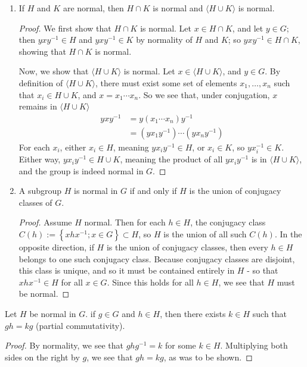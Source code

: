 \documentclass[12pt]{article}
\theoremstyle{definition}
\newenvironment{problem}[2][Problem]{\begin{trivlist}
\item[\hskip \labelsep {\bfseries #1}\hskip \labelsep {\bfseries #2.}]}{\end{trivlist}}
\begin{document}
\begin{problem}{6}
\begin{enumerate}[label=(\alph*)]
\item If $H$ and $K$ are normal, then $H \cap K$ is normal and $ \langle H \cup K \rangle$ is normal.
\begin{proof}
	We first show that $H\cap K$ is normal. Let $x \in H \cap K$, and let $y \in G$; then $yxy^{-1} \in H$ and $yxy^{-1} \in K$ by normality of $H$ and $K$; so $yxy^{-1} \in H \cap K$, showing that $H \cap K$ is normal.
	\par Now, we show that $\langle H \cup K\rangle$ is normal. Let $x \in \langle H \cup K\rangle$, and $y \in G$. By definition of $\langle H \cup K\rangle$, there must exist some set of elements $x_1, \dots , x_n$ such that $x_i \in H \cup K$, and $x = x_1 \cdots x_n$. So we see that, under conjugation, $x$ remains in $\langle H \cup K\rangle$
	\begin{align*}
		yxy^{-1} &= y(x_1\cdots x_n)y^{-1}\\
		&= (yx_1y^{-1})\cdots (yx_ny^{-1})
	\end{align*}
	For each $x_i$, either $x_i \in H$, meaning $yx_iy^{-1} \in H$, or $x_i \in K$, so $yx_i^{-1} \in K$. Either way, $yx_iy^{-1} \in H \cup K$, meaning the product of all $yx_iy^{-1}$ is in $\langle H \cup K\rangle$, and the group is indeed normal in $G$.
\end{proof}
    \item  A subgroup $H$ is normal in $G$ if and only if $H$ is the union of conjugacy classes of $G$.
    \begin{proof}
	    Assume $H$ normal. Then for each $h \in H$, the conjugacy class $C(h) := \left\{ xhx^{-1} ; x \in G \right\} \subset H$, so $H$ is the union of all such $C(h)$. In the opposite direction, if $H$ is the union of conjugacy classes, then every $h \in H$ belongs to one such conjugacy class. Because conjugacy classes are disjoint, this class is unique, and so it must be contained entirely in $H$ - so that $xhx^{-1} \in H$ for all $x \in G$. Since this holds for all $h \in H$, we see that $H$ must be normal.
    \end{proof}
\end{enumerate}
\end{problem}
\begin{problem}{7}
Let $H$ be normal in $G$. if $g \in G$ and $h \in H$, then there exists $k \in H$ such that $gh = kg$ (partial commutativity).
\begin{proof}
	By normality, we see that $ghg^{-1} = k$ for some $k \in H$. Multiplying both sides on the right by $g$, we see that $gh = kg$, as was to be shown.
\end{proof}
\end{problem}
\end{document}
